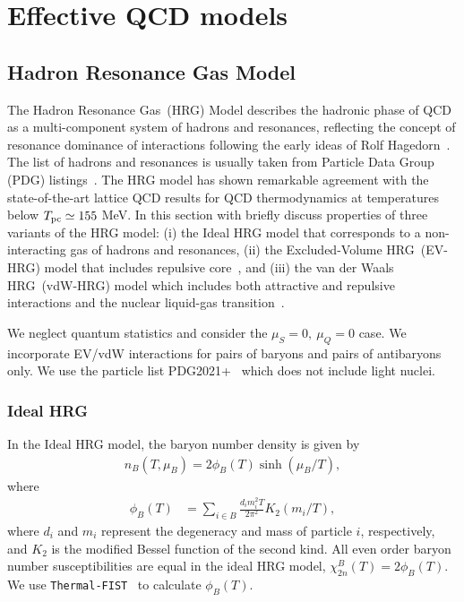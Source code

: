\documentclass[%
 reprint,
nofootinbib,
 amsmath,amssymb,
 aps,
prc
]{revtex4-2}
\begin{document}
\section{\label{EffectiveQCD}{Effective QCD models}}

\subsection{\label{HRG}Hadron Resonance Gas Model}

The Hadron Resonance Gas~(HRG) Model describes the hadronic phase of QCD as a multi-component system of hadrons and resonances, reflecting the concept of resonance dominance of interactions following the early ideas of Rolf Hagedorn~\cite{Hagedorn:1968jf}.
The list of hadrons and resonances is usually taken from Particle Data Group (PDG) listings~\cite{10.1093/ptep/ptac097}. 
The HRG model
has shown remarkable agreement with the state-of-the-art lattice QCD results for QCD thermodynamics at temperatures below $T_{\rm pc} \simeq 155$ MeV.
In this section with briefly discuss properties of three variants of the HRG model: (i) the Ideal HRG model that corresponds to a non-interacting gas of hadrons and resonances, (ii) the Excluded-Volume HRG~(EV-HRG) model that includes repulsive  core~\cite{Vovchenko:2017xad}, and (iii) the van der Waals HRG~(vdW-HRG) model which includes both attractive and repulsive interactions and the nuclear liquid-gas transition~\cite{Vovchenko:2016rkn}.   

We neglect quantum statistics and consider the $\mu_S=0,~\mu_Q=0$ case. 
We incorporate EV/vdW interactions for pairs of baryons and pairs of antibaryons only.
We use the particle list PDG2021+~\cite{SanMartin:2023zhv} which does not include light nuclei. 

\subsubsection{Ideal HRG}

In the Ideal HRG model, the baryon number density is given by
\begin{align}
n_B(T,\mu_B) = 2 \phi_B(T) \sinh(\mu_B/T),
\label{eq:nBIG}
\end{align}
where
\begin{align}
\phi_B(T) & = \sum_{i\in B}\frac{d_im_i^2T}{2\pi^2}  K_2(m_i/T),
\label{phi}
\end{align}
where $d_i$ and $m_i$ represent the degeneracy and mass of particle $i$, respectively, and  $K_2$ is the modified Bessel function of the second kind. 
All even order baryon number susceptibilities are equal in the ideal HRG model, $\chi_{2n}^B (T) = 2 \phi_B(T)$.
 We use \texttt{Thermal-FIST}~\cite{Vovchenko:2019pjl} to calculate $\phi_B(T)$.
\end{document}
